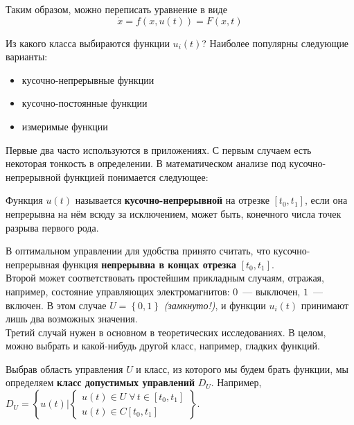 Таким образом, можно переписать уравнение в виде 
\begin{equation}
    \dot{x} = f(x, u(t)) = F(x, t)
\end{equation}

Из какого класса выбираются функции $u_i(t)$?
Наиболее популярны следующие варианты:
\begin{itemize}
    \item кусочно-непрерывные функции
    \item кусочно-постоянные функции
    \item измеримые функции
\end{itemize}
Первые два часто используются в приложениях.
С первым случаем есть некоторая тонкость в определении.
В математическом анализе под кусочно-непрерывной функцией понимается следующее:
\begin{defn}
    Функция $u(t)$ называется \textbf{кусочно-непрерывной} на отрезке $[t_0, t_1]$, 
    если она непрерывна на нём всюду за исключением, может быть, конечного числа точек разрыва первого рода.
\end{defn}
В оптимальном управлении для удобства принято считать, что кусочно-непрерывная функция \textbf{непрерывна в концах отрезка} $[t_0, t_1]$. \\
Второй может соответствовать простейшим прикладным случаям, отражая, например, состояние управляющих электромагнитов: $0$~--- выключен, $1$~--- включен.
В этом случае $U = \left\{0, 1\right\}$ \textit{(замкнуто!)}, и функции $u_i(t)$ принимают лишь два возможных значения. \\
Третий случай нужен в основном в теоретических исследованиях.
В целом, можно выбрать и какой-нибудь другой класс, например, гладких функций.

Выбрав область управления $U$ и класс, из которого мы будем брать функции, мы определяем \textbf{класс допустимых управлений} $D_U$.
Например, $D_U = \left\{ u(t) \biggl| \begin{cases} u(t) \in U \; \forall \, t \in [t_0, t_1]\\ u(t) \in C[t_0, t_1]\end{cases} \right\}$.

